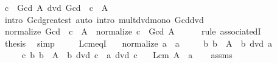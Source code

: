 \begin{isabellebody}
\ {\isachardoublequoteopen}c\ {\isacharasterisk}{\kern0pt}\ Gcd\ A\ dvd\ Gcd\ {\isacharparenleft}{\kern0pt}{\isacharparenleft}{\kern0pt}{\isacharasterisk}{\kern0pt}{\isacharparenright}{\kern0pt}\ c\ {\isacharbackquote}{\kern0pt}\ A{\isacharparenright}{\kern0pt}{\isachardoublequoteclose}\isanewline
\ \ \ \ \isamarkupfalse%
\ {\isacharparenleft}{\kern0pt}intro\ Gcd{\isacharunderscore}{\kern0pt}greatest{\isacharparenright}{\kern0pt}\ {\isacharparenleft}{\kern0pt}auto\ intro{\isacharcolon}{\kern0pt}\ mult{\isacharunderscore}{\kern0pt}dvd{\isacharunderscore}{\kern0pt}mono\ Gcd{\isacharunderscore}{\kern0pt}dvd{\isacharparenright}{\kern0pt}\isanewline
\ \ \isamarkupfalse%
\ \isamarkupfalse%
\ {\isachardoublequoteopen}normalize\ {\isacharparenleft}{\kern0pt}Gcd\ {\isacharparenleft}{\kern0pt}{\isacharparenleft}{\kern0pt}{\isacharasterisk}{\kern0pt}{\isacharparenright}{\kern0pt}\ c\ {\isacharbackquote}{\kern0pt}\ A{\isacharparenright}{\kern0pt}{\isacharparenright}{\kern0pt}\ {\isacharequal}{\kern0pt}\ normalize\ {\isacharparenleft}{\kern0pt}c\ {\isacharasterisk}{\kern0pt}\ Gcd\ A{\isacharparenright}{\kern0pt}{\isachardoublequoteclose}\isanewline
\ \ \ \ \isamarkupfalse%
\ {\isacharparenleft}{\kern0pt}rule\ associatedI{\isacharparenright}{\kern0pt}\isanewline
\ \ \isamarkupfalse%
\ \isamarkupfalse%
\ {\isacharquery}{\kern0pt}thesis\ \isamarkupfalse%
\ simp\ \ \ \ \isanewline
{}\isamarkupfalse%
%
\endisatagproof
{\isafoldproof}%
%
\isadelimproof
\isanewline
%
\endisadelimproof
\isanewline
{}\isamarkupfalse%
\ Lcm{\isacharunderscore}{\kern0pt}eqI{\isacharcolon}{\kern0pt}\isanewline
\ \ \ {\isachardoublequoteopen}normalize\ a\ {\isacharequal}{\kern0pt}\ a{\isachardoublequoteclose}\isanewline
\ \ \ \ \ {\isachardoublequoteopen}{\isasymAnd}b{\isachardot}{\kern0pt}\ b\ {\isasymin}\ A\ {\isasymLongrightarrow}\ b\ dvd\ a{\isachardoublequoteclose}\isanewline
\ \ \ \ \ {\isachardoublequoteopen}{\isasymAnd}c{\isachardot}{\kern0pt}\ {\isacharparenleft}{\kern0pt}{\isasymAnd}b{\isachardot}{\kern0pt}\ b\ {\isasymin}\ A\ {\isasymLongrightarrow}\ b\ dvd\ c{\isacharparenright}{\kern0pt}\ {\isasymLongrightarrow}\ a\ dvd\ c{\isachardoublequoteclose}\isanewline
\ \ \ {\isachardoublequoteopen}Lcm\ A\ {\isacharequal}{\kern0pt}\ a{\isachardoublequoteclose}\isanewline
%
\isadelimproof
\ \ %
\endisadelimproof
%
\isatagproof
{}\isamarkupfalse%
\ assms\ \isamarkupfalse%

\end{isabellebody}
